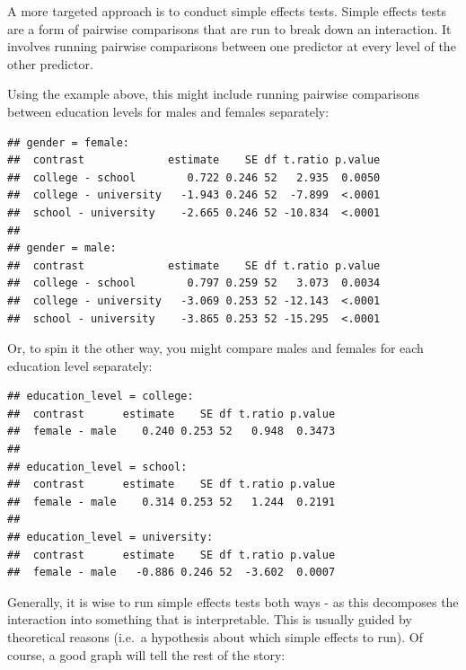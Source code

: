 \documentclass[
]{book}
\begin{document}
A more targeted approach is to conduct simple effects tests. Simple effects tests are a form of pairwise comparisons that are run to break down an interaction. It involves running pairwise comparisons between one predictor at every level of the other predictor.

Using the example above, this might include running pairwise comparisons between education levels for males and females separately:

\begin{verbatim}
## gender = female:
##  contrast             estimate    SE df t.ratio p.value
##  college - school        0.722 0.246 52   2.935  0.0050
##  college - university   -1.943 0.246 52  -7.899  <.0001
##  school - university    -2.665 0.246 52 -10.834  <.0001
## 
## gender = male:
##  contrast             estimate    SE df t.ratio p.value
##  college - school        0.797 0.259 52   3.073  0.0034
##  college - university   -3.069 0.253 52 -12.143  <.0001
##  school - university    -3.865 0.253 52 -15.295  <.0001
\end{verbatim}

Or, to spin it the other way, you might compare males and females for each education level separately:

\begin{verbatim}
## education_level = college:
##  contrast      estimate    SE df t.ratio p.value
##  female - male    0.240 0.253 52   0.948  0.3473
## 
## education_level = school:
##  contrast      estimate    SE df t.ratio p.value
##  female - male    0.314 0.253 52   1.244  0.2191
## 
## education_level = university:
##  contrast      estimate    SE df t.ratio p.value
##  female - male   -0.886 0.246 52  -3.602  0.0007
\end{verbatim}

Generally, it is wise to run simple effects tests both ways - as this decomposes the interaction into something that is interpretable. This is usually guided by theoretical reasons (i.e.~a hypothesis about which simple effects to run). Of course, a good graph will tell the rest of the story:
\end{document}
